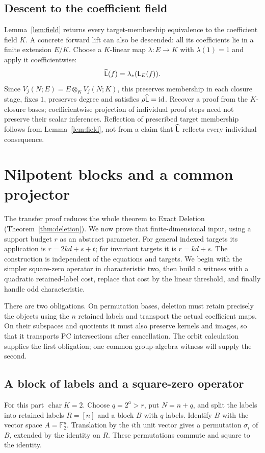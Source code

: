 \documentclass[11pt,a4paper]{article}
\theoremstyle{definition}\newtheorem{definition}[theorem]{Definition}
\theoremstyle{remark}\newtheorem{remark}[theorem]{Remark}
\newcommand{\Ftwo}{\mathbb F_2}
\begin{document}
\subsection{Descent to the coefficient field}\label{lift-sec:descent}
Lemma~\ref{lem:field} returns every target-membership equivalence to
the coefficient field $K$. A concrete forward lift can also be descended:
all its coefficients lie in a finite extension $E/K$. Choose a $K$-linear
map $\lambda:E\to K$ with $\lambda(1)=1$ and apply it coefficientwise:
\begin{equation}\label{lift-eq:fieldlift}
                  \widehat{\mathsf L}(f)=\lambda_*(\mathsf L_E(f)).
\end{equation}
Since $V_j(N;E)=E\otimes_K V_j(N;K)$, this preserves membership in each
closure stage, fixes $1$, preserves degree and satisfies
$\rho\widehat{\mathsf L}=\mathrm{id}$. Recover a proof from the $K$-closure
bases; coefficientwise projection of individual proof steps need not
preserve their scalar inferences. Reflection of prescribed target
membership follows from Lemma~\ref{lem:field}, not from a claim that
$\widehat{\mathsf L}$ reflects every individual consequence.

\section{Nilpotent blocks and a common projector}\label{sec:block-algebra}
The transfer proof reduces the whole theorem to Exact Deletion
(Theorem~\ref{thm:deletion}). We now prove that finite-dimensional input,
using a support budget $r$ as an abstract parameter. For general indexed
targets its application is $r=2kd+s+t$; for invariant targets it is
$r=kd+s$. The construction is independent of the equations and targets.
We begin with the simpler square-zero operator in characteristic two,
then build a witness with a quadratic retained-label cost, replace that
cost by the linear threshold, and finally handle odd characteristic.

There are two obligations. On permutation bases, deletion must retain
precisely the objects using the $n$ retained labels and transport the
actual coefficient maps. On their subspaces and quotients it must also
preserve kernels and images, so that it transports PC intersections
after cancellation. The orbit calculation supplies the first
obligation; one common group-algebra witness will supply the second.

\subsection{A block of labels and a square-zero operator}\label{sec:block2}
For this part $\operatorname{char}K=2$. Choose $q=2^a>r$, put $N=n+q$, and split the labels into retained labels $R=[n]$ and a block $B$ with $q$ labels. Identify $B$ with the vector space $A=\Ftwo^a$. Translation by the $i$th unit vector gives a permutation $\sigma_i$ of $B$, extended by the identity on $R$. These permutations commute and square to the identity.
\end{document}
